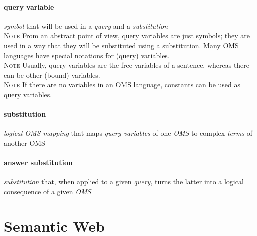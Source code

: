 \documentclass[10pt,%
\ifpretendfinal
final%
\else
draft%
\fi,
]{scrreprt}
\newcommand*{\termref}[1]{\textit{#1}}
\newcommand{\sclause}[1]{\section{#1}}
\newcommand{\termdefinition}[2]{\paragraph{#1} #2}
\newenvironment{definitions}[0]{\medskip }{}
\newenvironment{note}[0]{\ \\ \textsc{Note} \quad}{}
\begin{document}
\begin{definitions}
  \termdefinition{query variable}{\termref{symbol} that will be used in a \termref{query} and a \termref{substitution}}
  \begin{note}
   From an abstract point of view, query variables are just symbols; 
   they are used in a way
   that they will be substituted using a substitution.
   Many OMS languages have special notations for (query) variables.
  \end{note}
  \begin{note}
   Usually, query variables are the free variables of a sentence, whereas there
   can be other (bound) variables.
  \end{note}
  \begin{note}
  If there are no variables in an OMS language, constants can be used as query
  variables.
  \end{note}

  \termdefinition{substitution}{\termref{logical OMS mapping} that maps \termref{query variables} of one \termref{OMS} to complex \termref{terms} of another OMS}

  \termdefinition{answer substitution}{\termref{substitution} that, when applied to
   a given \termref{query}, turns the latter into a logical consequence of a
   given \termref{OMS}}

\end{definitions}  

\sclause{Semantic Web}\label{c:terms-semantic-web}
\end{document}
